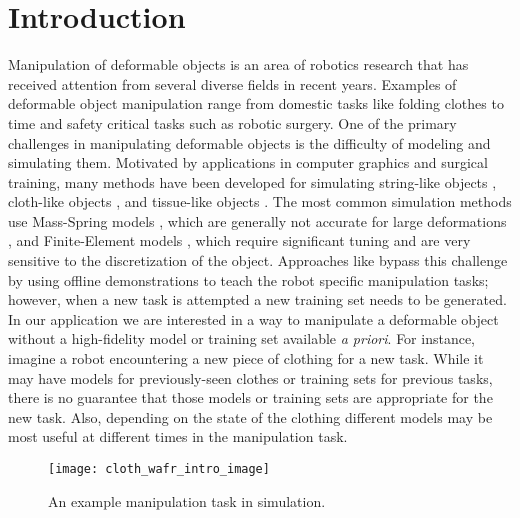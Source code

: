 \section{Introduction}

Manipulation of deformable objects is an area of robotics research that has received attention from several diverse fields in recent years. Examples of deformable object manipulation range from domestic tasks like folding clothes to time and safety critical tasks such as robotic surgery. One of the primary challenges in manipulating deformable objects is the difficulty of modeling and simulating them. Motivated by applications in computer graphics and surgical training, many methods have been developed for simulating string-like objects \cite{Bergou2008,Rungjiratananon2011}, cloth-like objects \cite{Baraff1998,Goldenthal2007}, and tissue-like objects \cite{Sutherland2006,Chentanez2009,Kim2007}. The most common simulation methods use Mass-Spring models \cite{Gibson1997,Essahbi2012}, which are generally not accurate for large deformations \cite{Maris2010}, and Finite-Element models \cite{Muller2002,Irving2004,Bathe2006}, which require significant tuning and are very sensitive to the discretization of the object. Approaches like \cite{Schulman2016,Huang2015} bypass this challenge by using offline demonstrations to teach the robot specific manipulation tasks; however, when a new task is attempted a new training set needs to be generated. In our application we are interested in a way to manipulate a deformable object without a high-fidelity model or training set available \textit{a priori}. For instance, imagine a robot encountering a new piece of clothing for a new task. While it may have models for previously-seen clothes or training sets for previous tasks, there is no guarantee that those models or training sets are appropriate for the new task. Also, depending on the state of the clothing different models may be most useful at different times in the manipulation task.

\begin{figure}[t]
    \centering
    \texttt{[image: cloth\_wafr\_intro\_image]}
    \caption{An example manipulation task in simulation.}
    \label{fig:intro_figure}
\end{figure}

